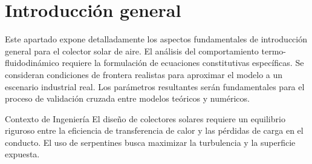 \section{Introducción general}
\label{sec:cap01_introduccion}

Este apartado expone detalladamente los aspectos fundamentales de introducción general para el colector solar de aire.
El análisis del comportamiento termo-fluidodinámico requiere la formulación de ecuaciones constitutivas específicas.
Se consideran condiciones de frontera realistas para aproximar el modelo a un escenario industrial real.
Los parámetros resultantes serán fundamentales para el proceso de validación cruzada entre modelos teóricos y numéricos.

\begin{cajainfo}{Contexto de Ingeniería}
El diseño de colectores solares requiere un equilibrio riguroso entre la eficiencia de transferencia de calor y las pérdidas de carga en el conducto.
El uso de serpentines busca maximizar la turbulencia y la superficie expuesta.
\end{cajainfo}
